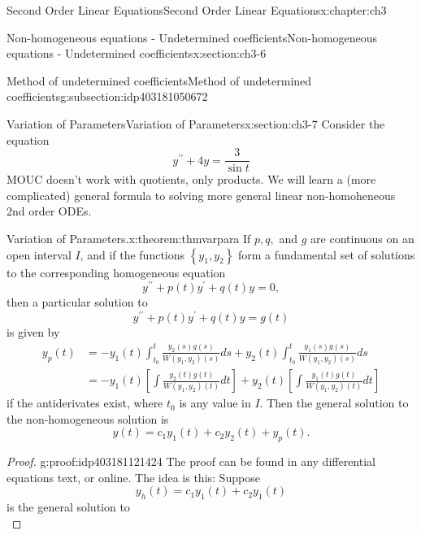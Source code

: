\documentclass[oneside,10pt,]{book}
\numberwithin{equation}{section}
\numberwithin{equation}{section}
\newcommand{\amp}{&}
\begin{document}
\begin{chapterptx}{Second Order Linear Equations}{}{Second Order Linear Equations}{}{}{x:chapter:ch3}
\begin{sectionptx}{Non-homogeneous equations - Undetermined coefficients}{}{Non-homogeneous equations - Undetermined coefficients}{}{}{x:section:ch3-6}
\begin{subsectionptx}{Method of undetermined coefficients}{}{Method of undetermined coefficients}{}{}{g:subsection:idp403181050672}
\end{subsectionptx}
\end{sectionptx}
%
%
\typeout{************************************************}
\typeout{************************************************}
%
\begin{sectionptx}{Variation of Parameters}{}{Variation of Parameters}{}{}{x:section:ch3-7}
Consider the equation%
\begin{equation*}
y^{\prime\prime}+4y =\frac{3}{\sin t}
\end{equation*}
MOUC doesn't work with quotients, only products. We will learn a (more complicated) general formula to solving more general linear non-homoheneous 2nd order ODEs.%
\begin{theorem}{Variation of Parameters.}{}{x:theorem:thmvarpara}%
If \(p,q,\) and \(g\) are continuous on an open interval \(I\), and if the functions \(\left\{ y_{1},y_{2}\right\} \) form a fundamental set of solutions to the corresponding homogeneous equation%
\begin{equation*}
y^{\prime\prime}+p(t)y^{\prime}+q(t)y=0,
\end{equation*}
then a particular solution to%
\begin{equation*}
y^{\prime\prime}+p(t)y^{\prime}+q(t)y=g(t)
\end{equation*}
is given by%
\begin{align*}
y_{p}(t) \amp =-y_{1}(t)\int_{t_{0}}^{t}\frac{y_{2}(s)g(s)}{W\left(y_{1},y_{2}\right)(s)}ds+y_{2}(t)\int_{t_{0}}^{t}\frac{y_{1}(s)g(s)}{W\left(y_{1},y_{2}\right)(s)}ds\\
\amp =-y_{1}(t)\left[\int\frac{y_{2}(t)g(t)}{W\left(y_{1},y_{2}\right)(t)}dt\right]+y_{2}(t)\left[\int\frac{y_{1}(t)g(t)}{W\left(y_{1},y_{2}\right)(t)}dt\right]
\end{align*}
if the antiderivates exist, where \(t_{0}\) is any value in \(I\). Then the general solution to the non-homogeneous solution is%
\begin{equation*}
y(t)=c_{1}y_{1}(t)+c_{2}y_{2}(t)+y_{p}(t).
\end{equation*}
%
\end{theorem}
\begin{proof}{}{g:proof:idp403181121424}
The proof can be found in any differential equations text, or online. The idea is this: Suppose%
\begin{equation*}
y_{h}(t)=c_{1}y_{1}(t)+c_{2}y_{1}(t)
\end{equation*}
is the general solution to%
\begin{equation*}

\end{equation*}
\end{proof}
\end{sectionptx}
\end{chapterptx}
\end{document}
